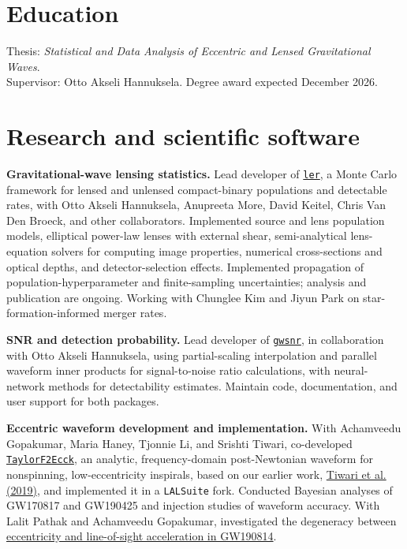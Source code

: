\documentclass[11pt]{article}
\begin{document}
\section*{Education}
Thesis: \textit{Statistical and Data Analysis of Eccentric and Lensed Gravitational Waves}.\\
Supervisor: Otto Akseli Hannuksela. Degree award expected December 2026.
\section*{Research and scientific software}
\textbf{Gravitational-wave lensing statistics.} Lead developer of \href{https://ler.hemantaph.com/}{\texttt{ler}}, a Monte Carlo framework for lensed and unlensed compact-binary populations and detectable rates, with Otto Akseli Hannuksela, Anupreeta More, David Keitel, Chris Van Den Broeck, and other collaborators. Implemented source and lens population models, elliptical power-law lenses with external shear, semi-analytical lens-equation solvers for computing image properties, numerical cross-sections and optical depths, and detector-selection effects. Implemented propagation of population-hyperparameter and finite-sampling uncertainties; analysis and publication are ongoing. Working with Chunglee Kim and Jiyun Park on star-formation-informed merger rates.

\textbf{SNR and detection probability.} Lead developer of \href{https://gwsnr.hemantaph.com/}{\texttt{gwsnr}}, in collaboration with Otto Akseli Hannuksela, using partial-scaling interpolation and parallel waveform inner products for signal-to-noise ratio calculations, with neural-network methods for detectability estimates. Maintain code, documentation, and user support for both packages.

\textbf{Eccentric waveform development and implementation.} With Achamveedu Gopakumar, Maria Haney, Tjonnie Li, and Srishti Tiwari, co-developed \href{https://arxiv.org/abs/2508.12697}{\texttt{TaylorF2Ecck}}, an analytic, frequency-domain post-Newtonian waveform for nonspinning, low-eccentricity inspirals, based on our earlier work, \href{https://arxiv.org/abs/1905.07956}{Tiwari et al. (2019)}, and implemented it in a \texttt{LALSuite} fork. Conducted Bayesian analyses of GW170817 and GW190425 and injection studies of waveform accuracy. With Lalit Pathak and Achamveedu Gopakumar, investigated the degeneracy between \href{https://arxiv.org/abs/2605.21955}{eccentricity and line-of-sight acceleration in GW190814}.
\end{document}
